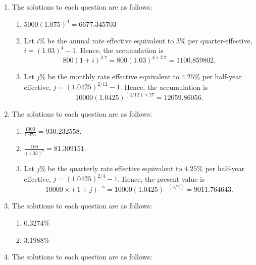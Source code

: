 \documentclass[
]{article}
\providecommand{\tightlist}{%
  \setlength{\itemsep}{0pt}\setlength{\parskip}{0pt}}
\theoremstyle{definition}
\theoremstyle{definition}
\theoremstyle{definition}
\theoremstyle{definition}
\theoremstyle{remark}
\begin{document}
\begin{enumerate}
\def\labelenumi{\arabic{enumi}.}
\item
  The solutions to each question are as follows:

  \begin{enumerate}
  \def\labelenumii{\arabic{enumii}.}
  \tightlist
  \item
    \(5000 (1.075)^4 = 6677.345703\)
  \item
    Let \(i\%\) be the annual rate effective equivalent to \(3\%\) per quarter-effective, \(i = (1.03)^4 - 1\).
    Hence, the accumulation is
    \[800(1+i)^{2.7} = 800(1.03)^{4\times2.7} = 1100.859802.\]
  \item
    Let \(j\%\) be the monthly rate effective equivalent to \(4.25\%\) per half-year effective, \(j = (1.0425)^{2/12} - 1\).
    Hence, the accumulation is
    \[10000(1.0425)^{(2/12)\times27} = 12059.86056.\]
  \end{enumerate}
\item
  The solutions to each question are as follows:

  \begin{enumerate}
  \def\labelenumii{\arabic{enumii}.}
  \tightlist
  \item
    \(\frac{1000}{1.075} = 930.232558\).
  \item
    \(\frac{100}{(1.03)^7} = 81.309151\).
  \item
    Let \(j\%\) be the quarterly rate effective equivalent to \(4.25\%\) per half-year effective, \(j = (1.0425)^{2/4} - 1\).
    Hence, the present value is
    \[10000\times (1+j)^{-5} = 10000(1.0425)^{-(5/2)} = 9011.764643.\]
  \end{enumerate}
\item
  The solutions to each question are as follows:

  \begin{enumerate}
  \def\labelenumii{\arabic{enumii}.}
  \tightlist
  \item
    0.3274\%
  \item
    3.1988\%
  \end{enumerate}
\item
  The solutions to each question are as follows:


\end{enumerate}
\end{document}
